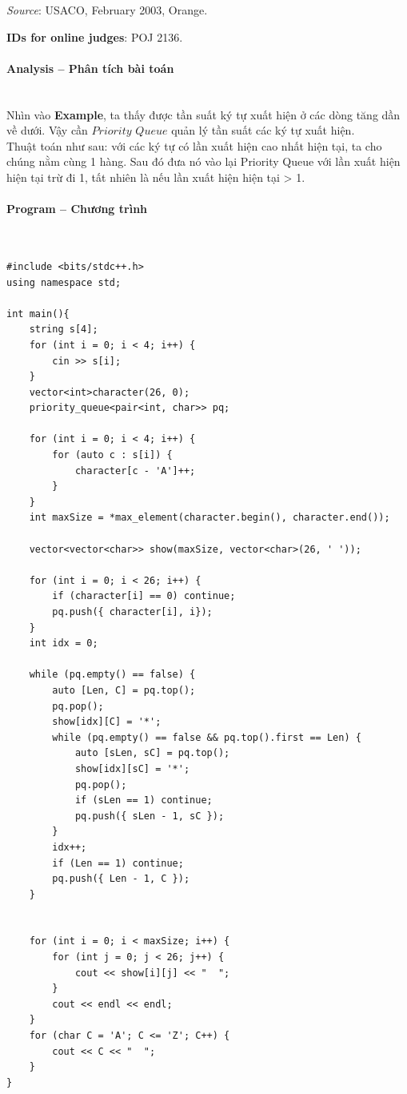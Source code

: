 \documentclass{article}
\begin{document}
\textit{Source}: USACO, February 2003, Orange.

\textbf{IDs for online judges}: POJ 2136.


\paragraph{Analysis -- Phân tích bài toán} \mbox{} \\

Nhìn vào \textbf{Example}, ta thấy được tần suất ký tự xuất hiện ở các dòng tăng dần về dưới. Vậy cần $Priority$ $Queue$ quản lý tần suất các ký tự xuất hiện. \\

Thuật toán như sau: với các ký tự có lần xuất hiện cao nhất hiện tại, ta cho chúng nằm cùng 1 hàng. Sau đó đưa nó vào lại Priority Queue với lần xuất hiện hiện tại trừ đi 1, tất nhiên là nếu lần xuất hiện hiện tại > 1.

\paragraph{Program -- Chương trình} \mbox{} \\


\begin{lstlisting}
#include <bits/stdc++.h>
using namespace std;

int main(){
	string s[4];
	for (int i = 0; i < 4; i++) {
		cin >> s[i];
	}
	vector<int>character(26, 0);
	priority_queue<pair<int, char>> pq;

	for (int i = 0; i < 4; i++) {
		for (auto c : s[i]) {
			character[c - 'A']++;
		}
	}
	int maxSize = *max_element(character.begin(), character.end());

	vector<vector<char>> show(maxSize, vector<char>(26, ' '));

	for (int i = 0; i < 26; i++) {
		if (character[i] == 0) continue;
		pq.push({ character[i], i});
	}
	int idx = 0;

	while (pq.empty() == false) {
		auto [Len, C] = pq.top();
		pq.pop();
		show[idx][C] = '*';
		while (pq.empty() == false && pq.top().first == Len) {
			auto [sLen, sC] = pq.top();
			show[idx][sC] = '*';
			pq.pop();
			if (sLen == 1) continue;
			pq.push({ sLen - 1, sC });
		}
		idx++;
		if (Len == 1) continue;
		pq.push({ Len - 1, C });
	}
	

	for (int i = 0; i < maxSize; i++) {
		for (int j = 0; j < 26; j++) {
			cout << show[i][j] << "  ";
		}
		cout << endl << endl;
	}
	for (char C = 'A'; C <= 'Z'; C++) {
		cout << C << "  ";
	}
}
\end{lstlisting}
\end{document}
